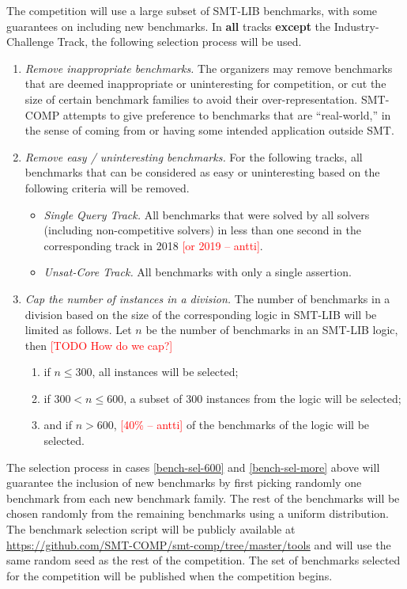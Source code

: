 \documentclass[12pt]{article}
\newcommand{\rem}[1]{\textcolor{red}{[#1]}}
\newcommand{\todo}[1]{\rem{TODO #1}}
\newcommand{\ah}[1]{\rem{#1 -- antti}}
\newcommand{\maintrack}{Single Query Track\xspace}
\newcommand{\ucoretrack}{Unsat-Core Track\xspace}
\newcommand{\challtrack}{Industry-Challenge Track\xspace}
\begin{document}
 \label{benchmark-selection}
The competition will use a large subset of SMT-LIB benchmarks, with some
guarantees on including new benchmarks.  In \textbf{all} tracks \textbf{except}
the \challtrack, the following selection process will be used.
\begin{enumerate}
\item \emph{Remove inappropriate benchmarks.} The
  organizers may remove benchmarks that are deemed inappropriate or
  uninteresting for competition, or cut the size of certain benchmark
  families to avoid their over-representation.  SMT-COMP attempts to
  give preference to benchmarks that are ``real-world,'' in the sense
  of coming from or having some intended application outside SMT.
\item \emph{Remove easy / uninteresting benchmarks.}
  For the following tracks, all benchmarks that can be
  considered as easy or uninteresting based on the following criteria
  will be removed.
  \begin{itemize}
    \item \emph{\maintrack.} All benchmarks that were solved by all
      solvers (including non-competitive solvers) in less than one second in
          the corresponding track in 2018 \ah{or 2019}.
    \item \emph{\ucoretrack.} All benchmarks with only a single assertion.
  \end{itemize}
\item \emph{Cap the number of instances in a division.}
  The number of benchmarks in a division based on the size of the
  corresponding logic in SMT-LIB will be limited as follows.
  Let $n$ be the number of benchmarks in an SMT-LIB logic, then
  \todo{How do we cap?}
  \begin{enumerate}
  \vspace{-1ex}
    \item \label{bench-sel-300} if $n \le 300$, all instances will be selected;
  \item \label{bench-sel-600} if $300 < n \leq 600$, a subset of 300 instances
    from the logic will be selected;
  \item \label{bench-sel-more} and if $n > 600$,
      \ah{40\%} of the benchmarks of the logic will be selected.
  \end{enumerate}
\end{enumerate}
%
The selection process in cases \ref{bench-sel-600} and \ref{bench-sel-more}
above will guarantee the inclusion of new benchmarks by first picking randomly
one benchmark from each new benchmark family.  The rest of the benchmarks will
be chosen randomly from the remaining benchmarks using a uniform distribution.
%
The benchmark selection script will be publicly available at
\url{https://github.com/SMT-COMP/smt-comp/tree/master/tools} and
will use the same random seed as the rest of the competition.  The set of
benchmarks selected for the competition will be published when the competition
begins.
\end{document}
